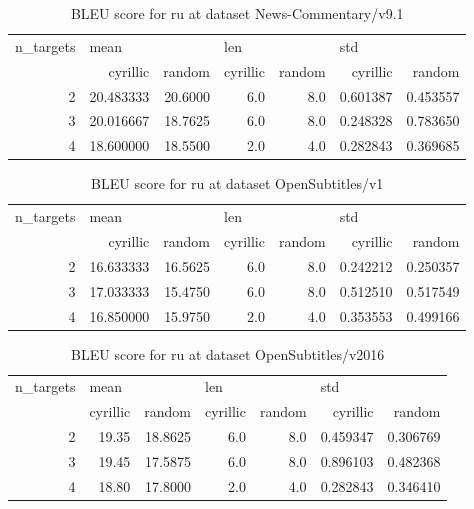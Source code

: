 \begin{table}[h]
\begin{tabular}{rrrrrrr}
\toprule
n\_targets & \multicolumn{2}{l}{mean} & \multicolumn{2}{l}{len} & \multicolumn{2}{l}{std} \\
          &   cyrillic &   random & cyrillic & random &  cyrillic &    random \\
\midrule
        2 &  20.483333 &  20.6000 &      6.0 &    8.0 &  0.601387 &  0.453557 \\
        3 &  20.016667 &  18.7625 &      6.0 &    8.0 &  0.248328 &  0.783650 \\
        4 &  18.600000 &  18.5500 &      2.0 &    4.0 &  0.282843 &  0.369685 \\
\bottomrule
\end{tabular}

\caption{BLEU score for  ru at dataset News-Commentary/v9.1 }
\label{ table:ru/News-Commentary/v9.1 }
\end{table}

\begin{table}[h]
\begin{tabular}{rrrrrrr}
\toprule
n\_targets & \multicolumn{2}{l}{mean} & \multicolumn{2}{l}{len} & \multicolumn{2}{l}{std} \\
          &   cyrillic &   random & cyrillic & random &  cyrillic &    random \\
\midrule
        2 &  16.633333 &  16.5625 &      6.0 &    8.0 &  0.242212 &  0.250357 \\
        3 &  17.033333 &  15.4750 &      6.0 &    8.0 &  0.512510 &  0.517549 \\
        4 &  16.850000 &  15.9750 &      2.0 &    4.0 &  0.353553 &  0.499166 \\
\bottomrule
\end{tabular}

\caption{BLEU score for  ru at dataset OpenSubtitles/v1 }
\label{ table:ru/OpenSubtitles/v1 }
\end{table}

\begin{table}[h]
\begin{tabular}{rrrrrrr}
\toprule
n\_targets & \multicolumn{2}{l}{mean} & \multicolumn{2}{l}{len} & \multicolumn{2}{l}{std} \\
          & cyrillic &   random & cyrillic & random &  cyrillic &    random \\
\midrule
        2 &    19.35 &  18.8625 &      6.0 &    8.0 &  0.459347 &  0.306769 \\
        3 &    19.45 &  17.5875 &      6.0 &    8.0 &  0.896103 &  0.482368 \\
        4 &    18.80 &  17.8000 &      2.0 &    4.0 &  0.282843 &  0.346410 \\
\bottomrule
\end{tabular}

\caption{BLEU score for  ru at dataset OpenSubtitles/v2016 }
\label{ table:ru/OpenSubtitles/v2016 }
\end{table}

